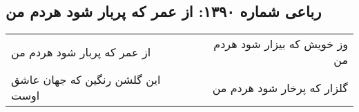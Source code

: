 \begin{center}
\section*{رباعی شماره ۱۳۹۰: از عمر که پربار شود هردم من}
\label{sec:1390}
\begin{longtable}{l p{0.5cm} r}
از عمر که پربار شود هردم من
&&
وز خویش که بیزار شود هردم من
\\
این گلشن رنگین که جهان عاشق اوست
&&
گلزار که پرخار شود هردم من
\\
\end{longtable}
\end{center}
